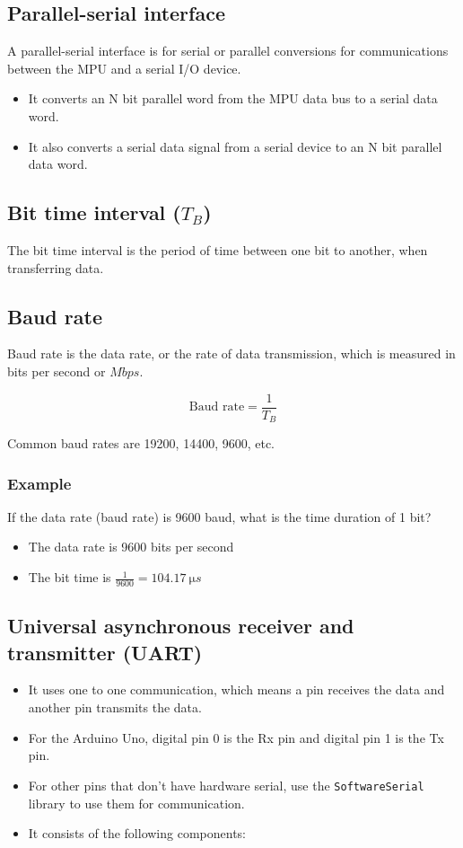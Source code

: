 \documentclass[11pt]{article}
\begin{document}
\subsection{Parallel-serial interface}
\label{sec:org0373e4f}
A parallel-serial interface is for serial or parallel conversions for communications between the MPU and a serial I/O device.
\begin{itemize}
\item It converts an N bit parallel word from the MPU data bus to a serial data word.
\item It also converts a serial data signal from a serial device to an N bit parallel data word.
\end{itemize}

\subsection{Bit time interval (\(T_B\))}
\label{sec:orgee05811}
The bit time interval is the period of time between one bit to another, when transferring data.

\subsection{Baud rate}
\label{sec:orga573cfa}
Baud rate is the data rate, or the rate of data transmission, which is measured in bits per second or \(\unit{Mbps}\).

\[\text{Baud rate} = \frac{1}{T_B}\]

Common baud rates are 19200, 14400, 9600, etc.

\subsubsection{Example}
\label{sec:org023c7b0}
If the data rate (baud rate) is 9600 baud, what is the time duration of 1 bit?
\begin{itemize}
\item The data rate is 9600 bits per second
\item The bit time is \(\frac{1}{9600} = \qty{104.17}{\micro s}\)
\end{itemize}

\subsection{Universal asynchronous receiver and transmitter (UART)}
\label{sec:org6fbc207}
\begin{itemize}
\item It uses one to one communication, which means a pin receives the data and another pin transmits the data.
\item For the Arduino Uno, digital pin 0 is the Rx pin and digital pin 1 is the Tx pin.
\item For other pins that don't have hardware serial, use the \texttt{SoftwareSerial} library to use them for communication.
\item It consists of the following components:
\end{itemize}
\end{document}
